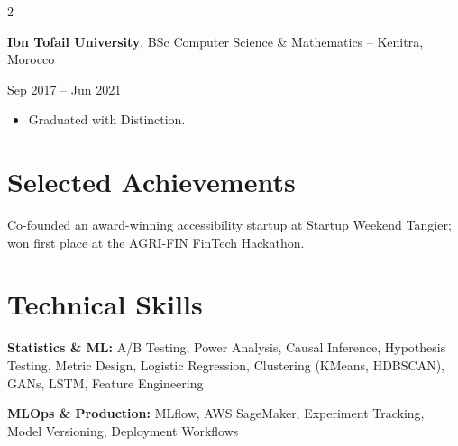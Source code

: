 \documentclass[10pt, a4paper]{article}
\newenvironment{highlights}{
    \begin{itemize}[
        topsep=0.10 cm,
        parsep=0.10 cm,
        partopsep=0pt,
        itemsep=0pt,
        leftmargin=10pt
    ]
}{
    \end{itemize}
}
\newenvironment{onecolentry}{\par}{\par}
\newenvironment{twocolentry}[2][]{
    \def\secondColumn{#2}
    \setcolumnwidth{\fill, 4.5 cm}
    \begin{paracol}{2}
}{
    \switchcolumn \raggedleft \secondColumn
    \end{paracol}
}
\begin{document}
\vspace{0.1 cm}

\begin{twocolentry}{Sep 2017 -- Jun 2021}
    \textbf{Ibn Tofail University}, BSc Computer Science \& Mathematics -- Kenitra, Morocco
\end{twocolentry}
\begin{onecolentry}
    \begin{highlights}
        \item Graduated with Distinction.
    \end{highlights}
\end{onecolentry}

\section{Selected Achievements}

\begin{onecolentry}
    Co-founded an award-winning accessibility startup at Startup Weekend Tangier; won first place at the AGRI-FIN FinTech Hackathon.
\end{onecolentry}

\section{Technical Skills}

\begin{onecolentry}
    \textbf{Statistics \& ML:} A/B Testing, Power Analysis, Causal Inference, Hypothesis Testing, Metric Design, Logistic Regression, Clustering (KMeans, HDBSCAN), GANs, LSTM, Feature Engineering
\end{onecolentry}

\vspace{0.1 cm}

\begin{onecolentry}
    \textbf{MLOps \& Production:} MLflow, AWS SageMaker, Experiment Tracking, Model Versioning, Deployment Workflows
\end{onecolentry}

\vspace{0.1 cm}
\end{document}
